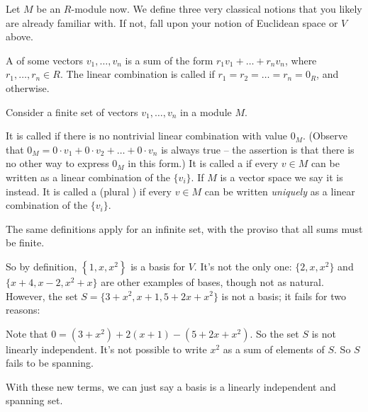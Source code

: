 Let $M$ be an $R$-module now.
We define three very classical notions that you likely are already familiar with.
If not, fall upon your notion of Euclidean space or $V$ above.
\begin{definition}
	A  of some vectors $v_1, \dots, v_n$
	is a sum of the form $r_1 v_1 + \dots + r_n v_n$,
	where $r_1, \dots, r_n \in R$.
	The linear combination is called 
	if $r_1 = r_2 = \dots = r_n = 0_R$, and  otherwise.
\end{definition}
\begin{definition}
	Consider a finite set of vectors $v_1, \dots, v_n$ in a module $M$.
	\begin{itemize}
		\ii It is called  if there
		is no nontrivial linear combination with value $0_M$.
		(Observe that $0_M = 0 \cdot v_1 + 0 \cdot v_2 + \dots + 0 \cdot v_n$
		is always true -- the assertion is that there is no other
		way to express $0_M$ in this form.)
		\ii It is called a  if every $v \in M$ can be written as
		a linear combination of the $\{v_i\}$.
		If $M$ is a vector space we say it is  instead.
		\ii It is called a  (plural )
		if every $v \in M$ can be written
		\emph{uniquely} as a linear combination of the $\{v_i\}$.
	\end{itemize}
	The same definitions apply for an infinite set, with the proviso
	that all sums must be finite.

\end{definition}
So by definition, $\left\{ 1,x,x^2 \right\}$ is a basis for $V$.
It's not the only one: $\{2, x, x^2\}$ and $\{x+4, x-2, x^2+x\}$
are other examples of bases, though not as natural.
However, the set $S = \{3+x^2, x+1, 5+2x+x^2\}$ is not a basis;
it fails for two reasons:
\begin{itemize}
	\ii Note that
	$0 = (3+x^2) + 2(x+1) - (5+2x+x^2)$.
	So the set $S$ is not linearly independent.
	\ii It's not possible to write $x^2$ as a sum of elements of $S$.
	So $S$ fails to be spanning.
\end{itemize}
With these new terms, we can just say a basis is a linearly independent and spanning set.

